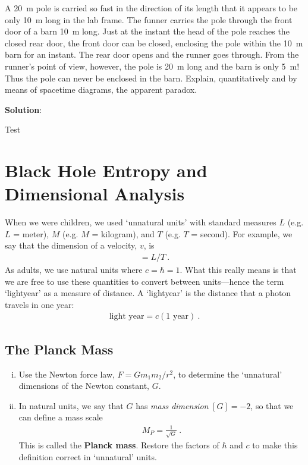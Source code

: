 \documentclass[12pt]{article}
\newenvironment{solution}%
	{\color{blue!60!black}
	\textsf{\textbf{Solution}}:
	}%
	{\ignorespacesafterend}
\numberwithin{equation}{section}    %
\begin{document}
A 20~m pole is carried so fast in the direction of its length that it appears to be only 10~m long in the lab frame. The funner carries the pole through the front door of a barn 10~m long. Just at the instant the head of the pole reaches the closed rear door, the front door can be closed, enclosing the pole within the 10~m barn for an instant. The rear door opens and the runner goes through. From the runner's point of view, however, the pole is 20~m long and the barn is only 5~m! Thus the pole can never be enclosed in the barn. Explain, quantitatively and by means of spacetime diagrams, the apparent paradox.


\begin{solution}
	Test
\end{solution}


\section{Black Hole Entropy and Dimensional Analysis}

When we were children, we used `unnatural units' with standard measures $L$ (e.g. $L$ = meter), $M$ (e.g. $M$ = kilogram), and $T$ (e.g. $T$ = second). For example, we say that the dimension of a velocity, $v$, is 
\begin{align}
	[v] = L/T \ .
\end{align}
As adults, we use natural units where $c = \hbar = 1$. What this really means is that we are free to use these quantities to convert between units---hence the term `lightyear' as a measure of distance. A `lightyear' is the distance that a photon travels in one year:
\begin{align}
	\text{light year} = c (1\text{ year})\ .
\end{align}

\subsection{The Planck Mass}

\begin{enumerate}[(i)]
\item Use the Newton force law, $F = G m_1m_2/r^2$, to determine the `unnatural' dimensions of the Newton constant, $G$. 
\item In natural units, we say that $G$ has \emph{mass dimension} $[G] = -2$, so that we can define a mass scale
\begin{align}
	M_P = \frac{1}{\sqrt{G}} \ .
\end{align}
This is called the \textbf{Planck mass}. Restore the factors of $\hbar$ and $c$ to make this definition correct in `unnatural' units. 
\end{enumerate}
\end{document}
